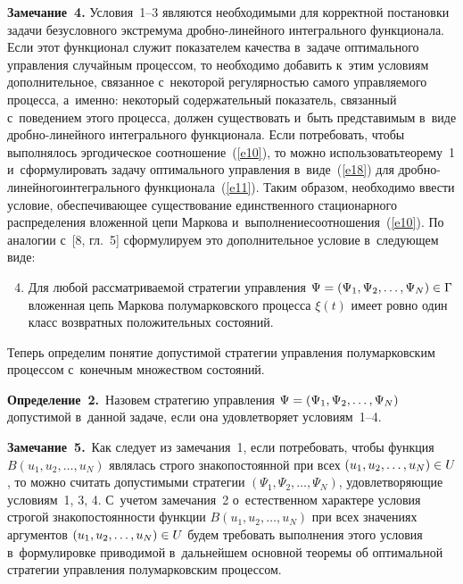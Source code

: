 \begin{multicols}{2}
\noindent
\textbf{Замечание~4.} Условия~1--3 являются необходимыми для корректной 
постановки задачи безусловного экстремума дроб\-но-ли\-ней\-но\-го интегрального 
функционала. Если этот функционал служит показателем качества в~задаче оптимального 
управления случайным процессом, то необходимо добавить к~этим условиям дополнительное, 
связанное с~некоторой регулярностью самого управляемого процесса, а~именно: некоторый 
содержательный показатель, связанный с~поведением этого процесса, должен существовать 
и~быть представимым в~виде дроб\-но-ли\-ней\-но\-го интегрального функционала. 
Если потребовать, чтобы выполнялось эргодическое соотношение~(\ref{e10}), 
то можно использовать\linebreak теорему~1 и~сформулировать задачу оптимального управ\-ле\-ния 
в~виде~(\ref{e18}) для дроб\-но-ли\-ней\-но\-го\linebreak интегрального функционала~(\ref{e11}). 
Таким образом, необходимо ввести условие, обеспечивающее существование единственного 
стационарного распределения вложенной цепи Маркова и~выполнение\linebreak соотношения~(\ref{e10}). 
По аналогии с~[8, гл.~5] сформулируем это дополнительное условие в~следующем виде:
\begin{enumerate}
\setcounter{enumi}{3}
\item Для любой рассматриваемой стратегии управ\-ле\-ния $\Psi\hm=
(\Psi_1, \Psi_2,\ldots,\Psi_N)\hm\in \Gamma$ вложенная цепь Маркова 
полумарковского процесса $\xi(t)$ имеет ровно один класс возвратных 
положительных состояний.
\end{enumerate}

Теперь определим понятие допустимой стратегии управления полумарковским процессом 
с~конечным множеством состояний.

\smallskip

\noindent
\textbf{Определение~2.}\ Назовем стратегию управления 
$\Psi\hm=(\Psi_1, \Psi_2,\ldots,\Psi_N)$ 
допустимой в~данной задаче, если она удовлетворяет условиям~1--4.


\smallskip

\noindent
\textbf{Замечание~5.}\ Как следует из замечания~1, если потребовать, 
чтобы функция $B(u_1, u_2,\ldots,u_N)$ являлась строго знакопостоянной при 
всех $(u_1, u_2,\ldots,u_N)\hm\in U$, то можно считать допустимыми стратегии 
$(\Psi_1, \Psi_2,\ldots,\Psi_N)$, удовлетворяющие условиям~1, 3, 4. С~учетом замечания~2 
о~естественном характере условия строгой знакопостоянности функции $B(u_1,u_2,\ldots,u_N)$ 
при всех значениях аргументов $(u_1, u_2,\ldots,u_N)\hm\in U$ будем требовать 
выполнения этого условия в~формулировке приводимой в~дальнейшем основной 
теоремы об оптимальной стратегии управления полумарковским процессом.


\end{multicols}
